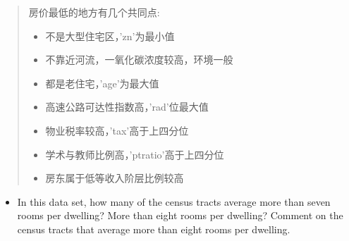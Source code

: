 \documentclass[
]{article}
\newenvironment{Shaded}{\begin{snugshade}}{\end{snugshade}}
\newcommand{\DecValTok}[1]{\textcolor[rgb]{0.00,0.00,0.81}{#1}}
\newcommand{\NormalTok}[1]{#1}
\newcommand{\SpecialCharTok}[1]{\textcolor[rgb]{0.00,0.00,0.00}{#1}}
\providecommand{\tightlist}{%
  \setlength{\itemsep}{0pt}\setlength{\parskip}{0pt}}
\begin{document}
\begin{quote}
房价最低的地方有几个共同点:

\begin{itemize}
\tightlist
\item
  不是大型住宅区，'zn'为最小值
\item
  不靠近河流，一氧化碳浓度较高，环境一般
\item
  都是老住宅，'age'为最大值
\item
  高速公路可达性指数高，'rad'位最大值
\item
  物业税率较高，'tax'高于上四分位
\item
  学术与教师比例高，'ptratio'高于上四分位
\item
  房东属于低等收入阶层比例较高
\end{itemize}
\end{quote}

\begin{itemize}
\tightlist
\item
  In this data set, how many of the census tracts average more than
  seven rooms per dwelling? More than eight rooms per dwelling? Comment
  on the census tracts that average more than eight rooms per dwelling.
\end{itemize}

\begin{Shaded}
\end{Shaded}
\end{document}
